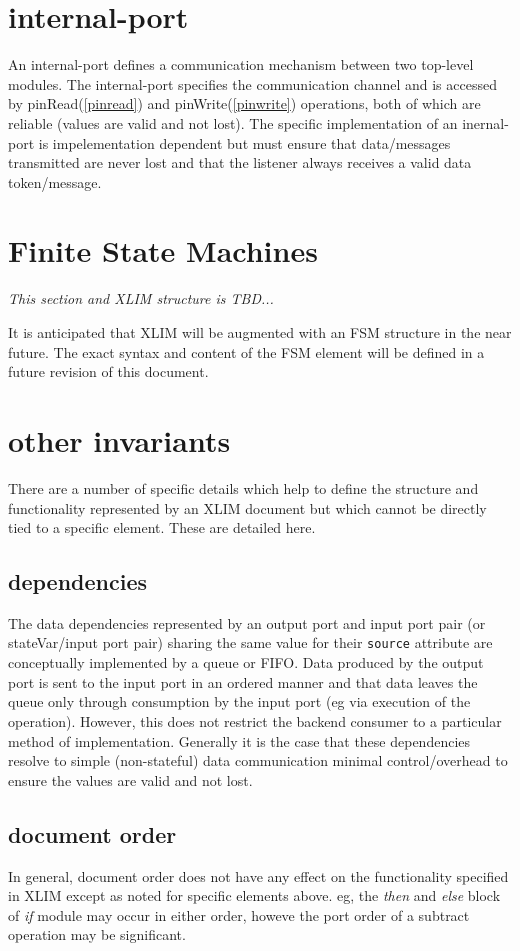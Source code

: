 \section{internal-port}\label{internalport}
An internal-port defines a communication mechanism between two top-level modules.  The internal-port specifies the communication channel and is accessed by pinRead(\ref{pinread}) and pinWrite(\ref{pinwrite}) operations, both of which are reliable (values are valid and not lost).  The specific implementation of an inernal-port is impelementation dependent but must ensure that data/messages transmitted are never lost and that the listener always receives a valid data token/message.

\section{Finite State Machines}
{\it
This section and XLIM structure is TBD...

It is anticipated that XLIM will be augmented with an FSM structure in the near future.  The exact syntax and content of the FSM element will be defined in a future revision of this document.
}

\section{other invariants}
There are a number of specific details which help to define the structure and functionality represented by an XLIM document but which cannot be directly tied to a specific element.  These are detailed here.
\subsection{dependencies}
The data dependencies represented by an output port and input port pair (or stateVar/input port
pair) sharing the same value for their {\tt source} attribute are conceptually implemented
by a queue or FIFO.  Data produced by the output port is sent to the input port in an ordered
manner and that data leaves the queue only through consumption by the input port (eg via
execution of the operation).  However, this does not restrict the backend consumer to a particular
method of implementation.  Generally it is the case that these dependencies resolve to simple
(non-stateful) data communication minimal control/overhead to ensure the values are valid and
not lost.

\subsection{document order}
In general, document order does not have any effect on the functionality specified in XLIM except as noted for specific elements above.  eg, the {\it then} and {\it else} block of {\it if} module may occur in either order, howeve the port order of a subtract operation may be significant.

